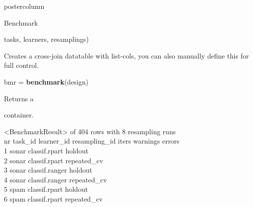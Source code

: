 \documentclass{beamer}
\newcommand{\codeinline}[1]{\begin{codeboxinline}#1\end{codeboxinline}}
\begin{document}
\begin{withoutheader}
\begin{frame}[fragile]{}
\begin{columns}
\begin{column}{.245\textwidth}
\begin{beamercolorbox}[center]{postercolumn}
\begin{minipage}{.98\textwidth}
{\begin{myblock}{Benchmark}
\begin{codeboxmultiline}[width=19.4cm]
							\hspace*{1ex}tasks, learners, resamplings)
						\end{codeboxmultiline}
						Creates a cross-join datatable with list-cols, you can also manually define this for full control.
						\\
						\begin{codebox}
							bmr = \textbf{benchmark}(design)
						\end{codebox}
						Returns a \codeinline{}
						container.\\
						\begin{codeboxmultiline}[width=27cm]
							\scriptsize{
								<BenchmarkResult> of 404 rows with 8 resampling runs\\
								nr task\_id \space\space\space\space learner\_id resampling\_id iters warnings errors\\
								1 \space\space\space sonar \space classif.rpart
								\space\space\space\space\space\space holdout
								\space\space\space\space 1
								\space\space\space\space\space\space\space 0
								\space\space\space\space\space 0\\
								2 \space\space\space sonar \space classif.rpart
								\space\space repeated\_cv
								\space{}00
								\space\space\space\space\space\space{}
								\space\space\space\space{}\\
								3 \space\space\space sonar classif.ranger
								\space\space\space\space\space\space holdout
								\space\space\space\space 1
								\space\space\space\space\space\space\space 0
								\space\space\space\space\space 0\\
								4 \space\space\space sonar classif.ranger
								\space\space repeated\_cv
								\space{}
								\space\space\space\space\space\space{}
								\space\space\space\space{}\\
								5 \space\space\space\space spam
								\space classif.rpart
								\space\space\space\space\space\space holdout
								\space\space\space{}
								\space\space\space\space\space\space{}
								\space\space\space\space{}\\
								6 \space\space\space\space spam
								\space  classif.rpart
								\space\space repeated\_cv
								\space{}
								\space\space\space\space\space\space{}
								\space\space\space\space{}\\
}
\end{codeboxmultiline}
\end{myblock}}
\end{minipage}
\end{beamercolorbox}
\end{column}
\end{columns}
\end{frame}
\end{withoutheader}
\end{document}
